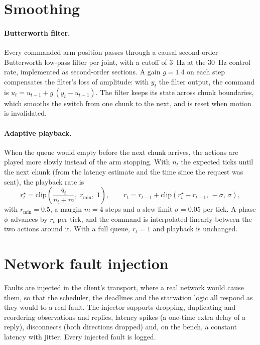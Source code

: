 \section{Smoothing}\label{sec:smoothing}

\paragraph{Butterworth filter.} Every commanded arm position passes through a causal second-order Butterworth low-pass
filter per joint, with a cutoff of 3~Hz at the 30~Hz control rate, implemented as second-order sections. A gain $g=1.4$
on each step compensates the filter's loss of amplitude: with $y_t$ the filter output, the command is
$u_t = u_{t-1} + g\,(y_t - u_{t-1})$. The filter keeps its state across chunk boundaries, which smooths the switch from
one chunk to the next, and is reset when motion is invalidated.

\paragraph{Adaptive playback.} When the queue would empty before the next chunk arrives, the actions are played more
slowly instead of the arm stopping. With $n_t$ the expected ticks until the next chunk (from the latency estimate and
the time since the request was sent), the playback rate is
\begin{equation}
  r^\star_t = \mathrm{clip}\!\left(\frac{q_t}{n_t + m},\; r_{\min},\; 1\right), \qquad
  r_t = r_{t-1} + \mathrm{clip}\!\left(r^\star_t - r_{t-1},\, -\sigma,\, \sigma\right),
\end{equation}
with $r_{\min}=0.5$, a margin $m=4$ steps and a slew limit $\sigma=0.05$ per tick. A phase $\phi$ advances by $r_t$
per tick, and the command is interpolated linearly between the two actions around it. With a full queue, $r_t=1$ and
playback is unchanged.

\section{Network fault injection}\label{sec:faults}

Faults are injected in the client's transport, where a real network would cause them, so that the scheduler, the
deadlines and the starvation logic all respond as they would to a real fault. The injector supports dropping,
duplicating and reordering observations and replies, latency spikes (a one-time extra delay of a reply), disconnects
(both directions dropped) and, on the bench, a constant latency with jitter. Every injected fault is logged.

